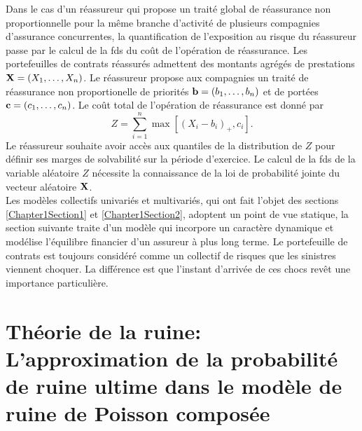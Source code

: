 Dans le cas d'un réassureur qui propose un traité global de réassurance non proportionnelle pour la même branche d'activité de plusieurs compagnies d'assurance concurrentes, la quantification de l'exposition au risque du réassureur passe par le calcul de la \gls{fds} du coût de l\rq{}opération de réassurance. Les portefeuilles de contrats réassurés admettent des montants agrégés de prestations $\bold{X}=(X_{1},\ldots,X_{n})$. Le réassureur propose aux compagnies un traité de réassurance non proportionelle de priorités $\bold{b}=(b_{1},\ldots,b_{n})$ et de portées $\bold{c}=(c_{1},\ldots,c_{n})$. Le coût total de l\rq{}opération de réassurance est donné par 
\begin{equation}\label{ReinsuranceCost}
Z=\sum_{i=1}^{n}\max\left[(X_{i}-b_{i})_{+},c_{i}\right].
\end{equation} 
Le réassureur souhaite avoir accès aux quantiles de la distribution de $Z$ pour définir ses marges de solvabilité sur la période d\rq{}exercice. Le calcul de la \gls{fds} de la variable aléatoire $Z$ nécessite la connaissance de la loi de probabilité jointe du vecteur aléatoire $\bold{X}$.\\

Les modèles collectifs univariés et multivariés, qui ont fait l\rq{}objet des sections \ref{Chapter1Section1} et \ref{Chapter1Section2}, adoptent un point de vue statique, la section suivante traite d\rq{}un modèle qui incorpore un caractère dynamique et modélise  l\rq{}équilibre financier d\rq{}un assureur à plus long terme. Le portefeuille de contrats est toujours considéré comme un collectif de risques que les sinistres viennent choquer. La différence est que l\rq{}instant d\rq{}arrivée de ces chocs revêt une importance particulière. 

\section{Théorie de la ruine: L\rq{}approximation de la probabilité de ruine ultime dans le modèle de ruine de Poisson composée}\label{Chapter1Section3}
